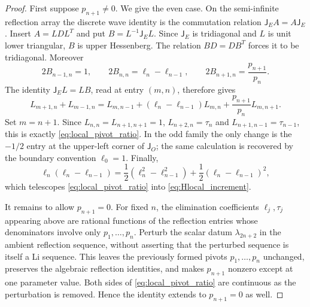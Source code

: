 \documentclass[11pt]{amsart}
\numberwithin{equation}{section}
\theoremstyle{plain}
\theoremstyle{definition}
\theoremstyle{remark}
\newcommand{\J}{\mathsf J}
\begin{document}
\begin{proof}
First suppose $p_{n+1}\ne0$.  We give the even case.  On the semi-infinite reflection array the discrete wave
identity is the commutation relation $\J_EA=A\J_E$.  Insert
$A=LDL^T$ and put $B=L^{-1}\J_EL$.  Since $\J_E$ is tridiagonal and $L$ is unit lower
triangular, $B$ is upper Hessenberg.  The relation $BD=DB^T$ forces it to be tridiagonal.
Moreover
\begin{equation}
 2B_{n-1,n}=1,
 \qquad
 2B_{n,n}=\ell_n-\ell_{n-1},
 \qquad
 2B_{n+1,n}=\frac{p_{n+1}}{p_n}.
 \label{eq:B_local_entries}
\end{equation}
The identity $\J_EL=LB$, read at entry $(m,n)$, therefore gives
\begin{equation}
 L_{m+1,n}+L_{m-1,n}
 =L_{m,n-1}+(\ell_n-\ell_{n-1})L_{m,n}
 +\frac{p_{n+1}}{p_n}L_{m,n+1}.
 \label{eq:L_discrete_wave}
\end{equation}
Set $m=n+1$.  Since $L_{n,n}=L_{n+1,n+1}=1$,
$L_{n+2,n}=\tau_n$ and $L_{n+1,n-1}=\tau_{n-1}$, this is exactly
\eqref{eq:local_pivot_ratio}.  In the odd family the only change is the $-1/2$ entry at the
upper-left corner of $\J_O$; the same calculation is recovered by the boundary convention
$\ell_0=1$.  Finally,
\begin{equation}
 \ell_n(\ell_n-\ell_{n-1})
 =\frac12(\ell_n^2-\ell_{n-1}^2)
 +\frac12(\ell_n-\ell_{n-1})^2,
\end{equation}
which telescopes \eqref{eq:local_pivot_ratio} into \eqref{eq:Hlocal_increment}.

It remains to allow $p_{n+1}=0$.  For fixed $n$, the elimination coefficients
$\ell_j,\tau_j$ appearing above are rational functions of the reflection entries whose
denominators involve only $p_1,\dots,p_n$.  Perturb the scalar datum \(\lambda_{2n+2}\) in the ambient reflection sequence, without asserting
that the perturbed sequence is itself a Li sequence.  This leaves the previously formed pivots
\(p_1,\ldots,p_n\) unchanged, preserves the algebraic reflection identities, and makes
\(p_{n+1}\) nonzero except at one parameter value.  Both sides of
\eqref{eq:local_pivot_ratio} are continuous as the perturbation is removed.  Hence the
identity extends to $p_{n+1}=0$ as well.
\end{proof}
\end{document}
